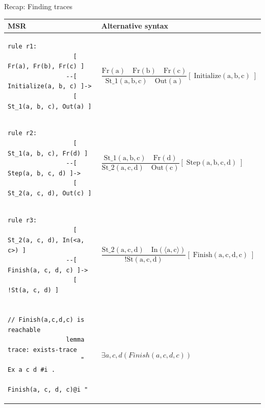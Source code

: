 \documentclass[11pt,aspectratio=169]{beamer}
\begin{document}
\begin{frame}[fragile]{Recap: Finding traces}
    \begin{table}[]
        \footnotesize
        \begin{tabular}{ll}
            MSR & Alternative syntax \\
            \toprule
            \begin{lstlisting}[style=tamarin, gobble=16]
                rule r1:
                  [ Fr(a), Fr(b), Fr(c) ]
                --[ Initialize(a, b, c) ]->
                  [ St_1(a, b, c), Out(a) ]
            \end{lstlisting} &
            $\mathrm{\dfrac{Fr(a) \quad Fr(b) \quad Fr(c)}{St\_1(a, b, c) \quad Out(a)}[\;Initialize(a, b, c)\;]}$ \\
            \midrule
            \begin{lstlisting}[style=tamarin, gobble=16]
                rule r2:
                  [ St_1(a, b, c), Fr(d) ]
                --[ Step(a, b, c, d) ]->
                  [ St_2(a, c, d), Out(c) ]
            \end{lstlisting} &
            $\mathrm{\dfrac{St\_1(a, b, c) \quad Fr(d)}{St\_2(a, c, d) \quad Out(c)}[\;Step(a, b, c, d)\;]}$ \\
            \midrule
            \begin{lstlisting}[style=tamarin, gobble=16]
                rule r3:
                  [ St_2(a, c, d), In(<a, c>) ]
                --[ Finish(a, c, d, c) ]->
                  [ !St(a, c, d) ]
            \end{lstlisting} &
            $\mathrm{\dfrac{St\_2(a, c, d) \quad In(\langle a, c \rangle)}{!St(a, c, d)}[\;Finish(a, c, d, c)\;]}$ \\
            \bottomrule \\
            \begin{lstlisting}[style=tamarin, gobble=16]
                // Finish(a,c,d,c) is reachable
                lemma trace: exists-trace
                    " Ex a c d #i .
                        Finish(a, c, d, c)@i "
            \end{lstlisting} &
            $\exists a, c, d (Finish(a,c,d,c))$
        \end{tabular}
    \end{table}
\end{frame}
\end{document}
